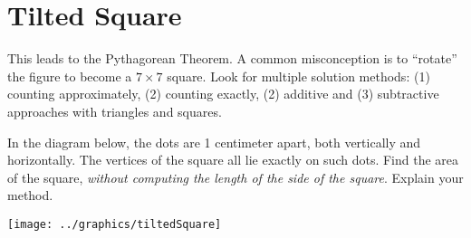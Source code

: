 \newpage

\section{Tilted Square}

\begin{teachingnote}
This leads to the Pythagorean Theorem.  A common misconception is to ``rotate'' the figure to become a $7\times 7$ square.  Look for multiple solution methods:  (1) counting approximately, (2) counting exactly, (2) additive and (3) subtractive approaches with triangles and squares.
\end{teachingnote}

\begin{prob}
In the diagram below, the dots are 1 centimeter apart, both vertically and horizontally.  The vertices of the square all lie exactly on such dots. Find the area of the square, \emph{without computing the length of the side of the square}.  Explain your method.  

\texttt{[image: ../graphics/tiltedSquare]}

\end{prob}
